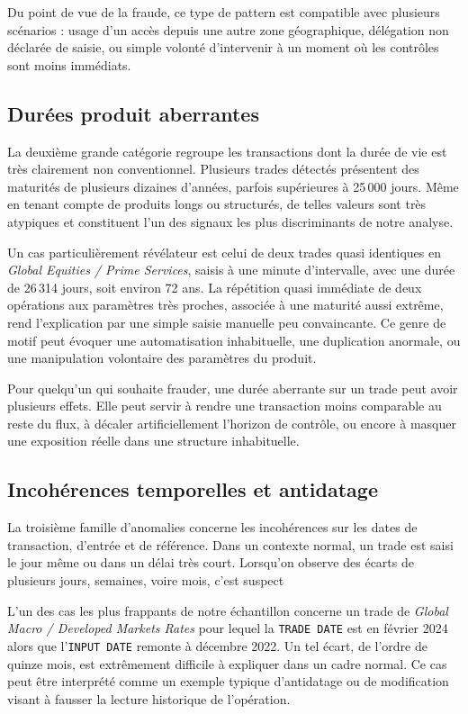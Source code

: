 \documentclass[a4paper]{article}
\begin{document}
Du point de vue de la fraude, ce type de pattern est compatible avec plusieurs scénarios : usage d'un accès depuis une autre zone géographique, délégation non déclarée de saisie, ou simple volonté d'intervenir à un moment où les contrôles sont moins immédiats. 



\subsection{Durées produit aberrantes}

La deuxième grande catégorie regroupe les transactions dont la durée de vie est très clairement non conventionnel. Plusieurs trades détectés présentent des maturités de plusieurs dizaines d'années, parfois supérieures à 25\,000 jours. Même en tenant compte de produits longs ou structurés, de telles valeurs sont très atypiques et constituent l'un des signaux les plus discriminants de notre analyse.

Un cas particulièrement révélateur est celui de deux trades quasi identiques en \textit{Global Equities / Prime Services}, saisis à une minute d'intervalle, avec une durée de 26\,314 jours, soit environ 72 ans. La répétition quasi immédiate de deux opérations aux paramètres très proches, associée à une maturité aussi extrême, rend l'explication par une simple saisie manuelle peu convaincante. Ce genre de motif peut évoquer une automatisation inhabituelle, une duplication anormale, ou une manipulation volontaire des paramètres du produit. 

Pour quelqu'un qui souhaite frauder, une durée aberrante sur un trade peut avoir plusieurs effets. Elle peut servir à rendre une transaction moins comparable au reste du flux, à décaler artificiellement l'horizon de contrôle, ou encore à masquer une exposition réelle dans une structure inhabituelle.



\subsection{Incohérences temporelles et antidatage}

La troisième famille d'anomalies concerne les incohérences sur les dates de transaction, d'entrée et de référence. Dans un contexte normal, un trade est saisi le jour même ou dans un délai très court. Lorsqu'on observe des écarts de plusieurs jours, semaines, voire mois, c'est suspect

L'un des cas les plus frappants de notre échantillon concerne un trade de \textit{Global Macro / Developed Markets Rates} pour lequel la \texttt{TRADE DATE} est en février 2024 alors que l'\texttt{INPUT DATE} remonte à décembre 2022. Un tel écart, de l'ordre de quinze mois, est extrêmement difficile à expliquer dans un cadre normal. Ce cas peut être interprété comme un exemple typique d'antidatage ou de modification visant à fausser la lecture historique de l'opération. 
\end{document}
